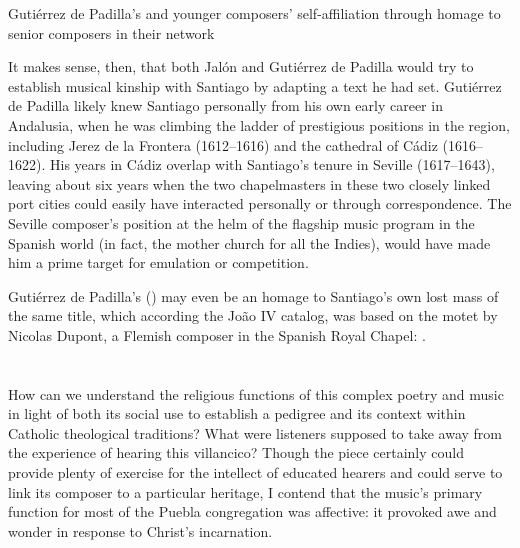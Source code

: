 {Gutiérrez de Padilla's  and younger composers' self-affiliation
through homage to senior composers in their network}

It makes sense, then, that both Jalón and Gutiérrez de Padilla would try to
establish musical kinship with Santiago by adapting a text he had set.
Gutiérrez de Padilla likely knew Santiago personally from his own early career
in Andalusia, when he was climbing the ladder of prestigious positions in the
region, including Jerez de la Frontera (1612--1616) and the cathedral of Cádiz
(1616--1622).%
    \Autocite{Gembero:Padilla}
His years in Cádiz overlap with Santiago's tenure in Seville (1617--1643),
leaving about six years when the two chapelmasters in these two closely linked
port cities could easily have interacted personally or through correspondence.
The Seville composer's position at the helm of the flagship music program in
the Spanish world (in fact, the mother church for all the Indies), would have
made him a prime target for emulation or competition.%
\begin{Footnote}
    Gutiérrez de Padilla's 
    () may even be an homage to Santiago's own lost
    mass of the same title, which according the João IV catalog, was based
    on the motet  by Nicolas Dupont, a Flemish
    composer in the Spanish Royal Chapel:
    \Autocites 
    [417, caixão 34, : ;
    381, caixão 32, : ] 
    {JohnIV:Catalog}.
\end{Footnote}

\section{}

How can we understand the religious functions of this complex poetry and music
in light of both its social use to establish a pedigree and its context within
Catholic theological traditions?
What were listeners supposed to take away from the experience of hearing this
villancico?
Though the piece certainly could provide plenty of exercise for the intellect
of educated hearers and could serve to link its composer to a particular
heritage, I contend that the music's primary function for most of the Puebla
congregation was affective: it provoked awe and wonder in response to Christ's
incarnation.

